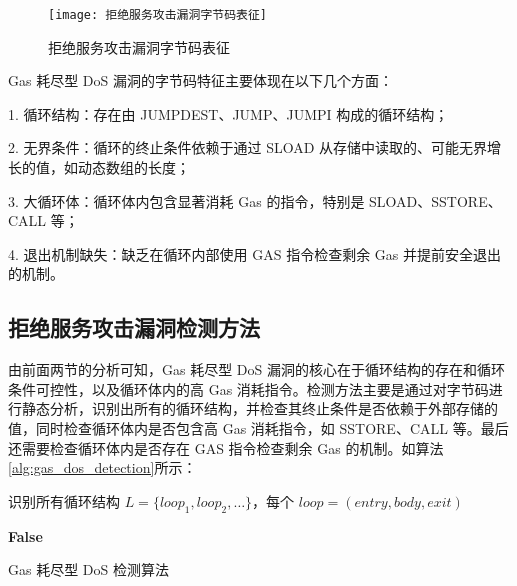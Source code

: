 \documentclass[print, master, vlined, timesmath]{DissertUESTC}
\begin{document}
\begin{figure}[h]
    \centering
    \texttt{[image: 拒绝服务攻击漏洞字节码表征]}
    \caption{拒绝服务攻击漏洞字节码表征}
    \label{fig:拒绝服务攻击漏洞字节码表征}
\end{figure}    

Gas 耗尽型 DoS 漏洞的字节码特征主要体现在以下几个方面：

1. 循环结构：存在由 JUMPDEST、JUMP、JUMPI 构成的循环结构；

2. 无界条件：循环的终止条件依赖于通过 SLOAD 从存储中读取的、可能无界增长的值，如动态数组的长度；

3. 大循环体：循环体内包含显著消耗 Gas 的指令，特别是 SLOAD、SSTORE、 CALL 等；

4. 退出机制缺失：缺乏在循环内部使用 GAS 指令检查剩余 Gas 并提前安全退出的机制。


\subsection{拒绝服务攻击漏洞检测方法}

由前面两节的分析可知，Gas 耗尽型 DoS 漏洞的核心在于循环结构的存在和循环条件可控性，以及循环体内的高 Gas 消耗指令。检测方法主要是通过对字节码进行静态分析，识别出所有的循环结构，并检查其终止条件是否依赖于外部存储的值，同时检查循环体内是否包含高 Gas 消耗指令，如 SSTORE、CALL 等。最后还需要检查循环体内是否存在 GAS 指令检查剩余 Gas 的机制。如算法\ref{alg:gas_dos_detection}所示：


\begin{algorithm}[H]
    
    识别所有循环结构 $L = \{loop_1, loop_2, \dots\}$，每个 $loop = (entry, body, exit)$\;
    
    
    \Return \textbf{False}
    \caption{Gas 耗尽型 DoS 检测算法}
    \label{alg:gas_dos_detection}
\end{algorithm}
    
\end{document}
